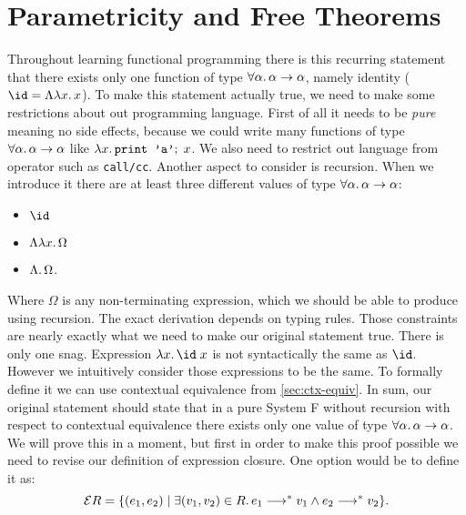 \section{Parametricity and Free Theorems}

Throughout learning functional programming there is this recurring statement
that there exists only one function of type
$\forall\alpha\ldotp\alpha\to\alpha$,
namely identity ($\id = \Lambda\lambda x\ldotp x$).
To make this statement actually true, we need to make some restrictions about
out programming language. First of all it needs to be \emph{pure} meaning no
side effects, because we could write many functions of type
$\forall\alpha\ldotp\alpha\to\alpha$ like
$\lambda x\ldotp\texttt{print 'a'};\;x$.
We also need to restrict out language from operator such as \texttt{call/cc}.
Another aspect to consider is recursion. When we introduce it there are at
least three different values of type $\forall\alpha\ldotp\alpha\to\alpha$:
\begin{itemize}
  \item $\id$
  \item $\Lambda \lambda x\ldotp\Omega$
  \item $\Lambda \ldotp\Omega$.
\end{itemize}
Where $\Omega$ is any non-terminating expression, which we should be able
to produce using recursion. The exact derivation depends on typing rules.
Those constraints are nearly exactly what we need to make our original
statement true. There is only one snag. Expression $\lambda x\ldotp \id\; x$
is not syntactically the same as $\id$. However we intuitively consider those
expressions to be the same. To formally define it we can use
contextual equivalence from \autoref{sec:ctx-equiv}. In sum, our original
statement should state that in a pure System F without recursion with
respect to contextual equivalence there exists only one value of type
$\forall\alpha\ldotp\alpha\to\alpha$. We will prove this in a moment,
but first in order to make this proof possible we need to revise our
definition of expression closure. One option would be to define it as:
  \[
    \mathcal E R= \{ (e_1, e_2) \mid \exists (v_1, v_2) \in R\ldotp
      e_1 \longrightarrow^* v_1 \wedge e_2 \longrightarrow^* v_2 \}.
  \]

